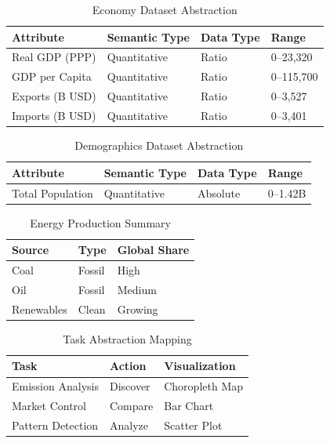 \documentclass[conference]{IEEEtran}
\begin{document}
\begin{table}[H]
\centering
\caption{Economy Dataset Abstraction}
\small
\begin{tabular}{|l|l|l|l|}
\hline
\textbf{Attribute} & \textbf{Semantic Type} & \textbf{Data Type} & \textbf{Range} \\
\hline
Real GDP (PPP) & Quantitative & Ratio & 0--23,320 \\
GDP per Capita & Quantitative & Ratio & 0--115,700 \\
Exports (B USD) & Quantitative & Ratio & 0--3,527 \\
Imports (B USD) & Quantitative & Ratio & 0--3,401 \\
\hline
\end{tabular}
\end{table}

\begin{table}[H]
\centering
\caption{Demographics Dataset Abstraction}
\small
\begin{tabular}{|l|l|l|l|}
\hline
\textbf{Attribute} & \textbf{Semantic Type} & \textbf{Data Type} & \textbf{Range} \\
\hline
Total Population & Quantitative & Absolute & 0--1.42B \\
\hline
\end{tabular}
\end{table}

\begin{table}[H]
\centering
\caption{Energy Production Summary}
\small
\begin{tabular}{|l|l|l|}
\hline
Source & Type & Global Share \\
\hline
Coal & Fossil & High \\
Oil & Fossil & Medium \\
Renewables & Clean & Growing \\
\hline
\end{tabular}
\end{table}

\begin{table}[H]
\centering
\caption{Task Abstraction Mapping}
\small
\begin{tabular}{|l|l|l|}
\hline
Task & Action & Visualization \\
\hline
Emission Analysis & Discover & Choropleth Map \\
Market Control & Compare & Bar Chart \\
Pattern Detection & Analyze & Scatter Plot \\
\hline
\end{tabular}
\end{table}
\end{document}
